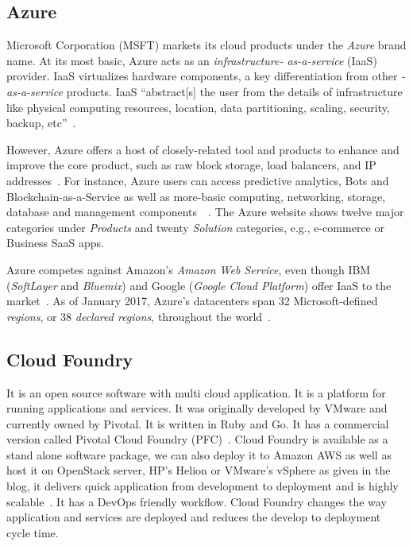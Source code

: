 \subsection{Azure}

Microsoft Corporation (MSFT) markets its cloud products under the
\textit{Azure} brand name. At its most basic, Azure acts as an
\textit{infrastructure- as-a-service} (IaaS) provider.  IaaS virtualizes
hardware components, a key differentiation from other \textit{-as-a-service}
products. IaaS ``abstract[s] the user from the details of
infrastructure like physical computing resources, location, data
partitioning, scaling, security, backup,
etc''~\cite{www-wikipedia-cloud}.

However, Azure offers a host of closely-related tool and products to
enhance and improve the core product, such as raw block storage, load
balancers, and IP addresses~\cite{www-azure-msft}. For instance, Azure
users can access predictive analytics, Bots and
Blockchain-as-a-Service as well as more-basic computing, networking,
storage, database and management
components~\cite{www-sec-edgar-msft}~\cite{www-azure-msft}.  The Azure
website shows twelve major categories under \textit{Products} and twenty
\textit{Solution} categories, e.g., e-commerce or Business SaaS apps.

Azure competes against Amazon's \textit{Amazon Web Service}, even though IBM
(\textit{SoftLayer} and \textit{Bluemix}) and Google (\textit{Google Cloud Platform})
offer IaaS to the market~\cite{www-aws-amzn, www-softlayer-ibm,
  www-bluemix-ibm,www-cloud-google}.  As of January 2017, Azure's
datacenters span 32 Microsoft-defined \textit{regions}, or 38 \textit{declared
regions}, throughout the world~\cite{www-azure-msft}.

    \pv

\subsection{Cloud Foundry}

It is an open source software with multi cloud application. It is a
platform for running applications and services. It was originally
developed by VMware and currently owned by Pivotal. It is written in
Ruby and Go. It has a commercial version called Pivotal Cloud Foundry
(PFC)~\cite{www-cloudfoundry-book}. Cloud Foundry is available as a
stand alone software package, we can also deploy it to Amazon AWS as
well as host it on OpenStack server, HP’s Helion or VMware’s vSphere
as given in the blog, it delivers quick application from development
to deployment and is highly scalable~\cite{www-cloudfoundry-blog}. It
has a DevOps friendly workflow.  Cloud Foundry changes the way
application and services are deployed and reduces the develop to
deployment cycle time.

